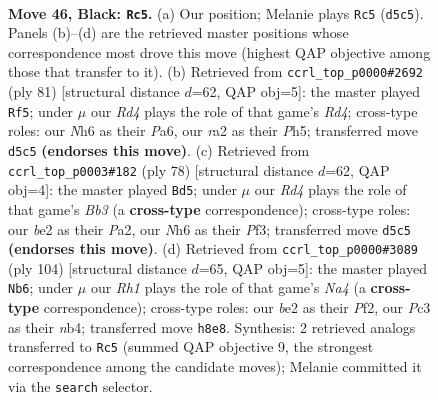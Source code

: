 \documentclass[11pt]{article}
\begin{document}
\clearpage

\begin{figure}[p]\centering
\begin{subfigure}{0.46\textwidth}\centering
\resizebox{\linewidth}{!}{%
\newchessgame
\chessboard[
  setfen={7r/p3b1kp/P6n/3r4/8/1Pp3BP/R1P1B1PK/1R6 b - - 0 46},
  showmover=false,
  pgfstyle=straightmove, color=movearrow, markmove={d5-c5}
]}
\caption{}
\end{subfigure}\hfill
\begin{subfigure}{0.46\textwidth}\centering
\resizebox{\linewidth}{!}{%
\newchessgame
\chessboard[
  setfen={8/1p1b4/p5k1/3r2pp/1B6/P4P2/1P2RKPP/8 b - - 4 41},
  showmover=false,
  pgfstyle=straightmove, color=movearrow, markmove={d5-f5}
]}
\caption{}
\end{subfigure}
\\[4pt]
\begin{subfigure}{0.46\textwidth}\centering
\resizebox{\linewidth}{!}{%
\newchessgame
\chessboard[
  setfen={3R4/7p/p1r2pk1/1p2pb2/1P6/1B2KP2/P3P2P/8 w - - 12 40},
  showmover=false,
  pgfstyle=straightmove, color=movearrow, markmove={b3-d5}
]}
\caption{}
\end{subfigure}\hfill
\begin{subfigure}{0.46\textwidth}\centering
\resizebox{\linewidth}{!}{%
\newchessgame
\chessboard[
  setfen={4rk2/5p2/p5p1/7p/NnbNp3/R3P2P/5PP1/6K1 w - - 0 53},
  showmover=false,
  pgfstyle=straightmove, color=movearrow, markmove={a4-b6}
]}
\caption{}
\end{subfigure}
\caption{\textbf{Move 46, Black: \texttt{Rc5}.} (a) Our position; Melanie plays \texttt{Rc5} (\texttt{d5c5}). Panels (b)--(d) are the retrieved master positions whose correspondence most drove this move (highest QAP objective among those that transfer to it). (b) Retrieved from \texttt{ccrl\_top\_p0000\#2692} (ply 81) [structural distance $d$=62, QAP obj=5]: the master played \texttt{Rf5}; under $\mu$ our \emph{Rd4} plays the role of that game's \emph{Rd4}; cross-type roles: our \emph{N}h6 as their \emph{P}a6, our \emph{r}a2 as their \emph{P}h5; transferred move \texttt{d5c5} \textbf{(endorses this move)}. (c) Retrieved from \texttt{ccrl\_top\_p0003\#182} (ply 78) [structural distance $d$=62, QAP obj=4]: the master played \texttt{Bd5}; under $\mu$ our \emph{Rd4} plays the role of that game's \emph{Bb3} (a \textbf{cross-type} correspondence); cross-type roles: our \emph{b}e2 as their \emph{P}a2, our \emph{N}h6 as their \emph{P}f3; transferred move \texttt{d5c5} \textbf{(endorses this move)}. (d) Retrieved from \texttt{ccrl\_top\_p0000\#3089} (ply 104) [structural distance $d$=65, QAP obj=5]: the master played \texttt{Nb6}; under $\mu$ our \emph{Rh1} plays the role of that game's \emph{Na4} (a \textbf{cross-type} correspondence); cross-type roles: our \emph{b}e2 as their \emph{P}f2, our \emph{P}c3 as their \emph{n}b4; transferred move \texttt{h8e8}. Synthesis: 2 retrieved analogs transferred to \texttt{Rc5} (summed QAP objective 9, the strongest correspondence among the candidate moves); Melanie committed it via the \texttt{search} selector.}
\label{fig:thought-m91}
\end{figure}
\end{document}
